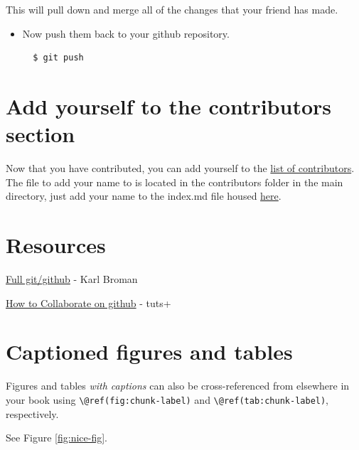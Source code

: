 \documentclass[
]{book}
\theoremstyle{definition}
\theoremstyle{definition}
\theoremstyle{definition}
\theoremstyle{definition}
\theoremstyle{remark}
\begin{document}
This will pull down and merge all of the changes that your friend has made.

\begin{itemize}
\item
  Now push them back to your github repository.

\begin{verbatim}
  $ git push
\end{verbatim}
\end{itemize}

\hypertarget{add-yourself-to-the-contributors-section}{%
\section{Add yourself to the contributors section}\label{add-yourself-to-the-contributors-section}}

Now that you have contributed, you can add yourself to the \href{http://ropensci.github.io/reproducibility-guide/contributors/}{list of contributors}. The file to add your name to is located in the contributors folder in the main directory, just add your name to the index.md file housed \href{https://github.com/ropensci/reproducibility-guide/tree/gh-pages/contributors}{here}.

\hypertarget{resources}{%
\section{Resources}\label{resources}}

\href{http://kbroman.github.io/github_tutorial/}{Full git/github} - Karl Broman

\href{http://code.tutsplus.com/tutorials/how-to-collaborate-on-github--net-34267}{How to Collaborate on github} - tuts+

\hypertarget{captioned-figures-and-tables}{%
\section{Captioned figures and tables}\label{captioned-figures-and-tables}}

Figures and tables \emph{with captions} can also be cross-referenced from elsewhere in your book using \texttt{\textbackslash{}@ref(fig:chunk-label)} and \texttt{\textbackslash{}@ref(tab:chunk-label)}, respectively.

See Figure \ref{fig:nice-fig}.
\end{document}
